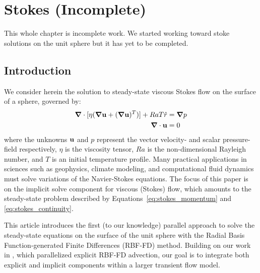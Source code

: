 
\chapter{Stokes (Incomplete)}

This whole chapter is incomplete work. We started working toward stoke solutions on the unit sphere but it has yet to be completed. 

\section{Introduction}

We consider herein the solution to steady-state viscous Stokes flow on the surface of a sphere, governed by: 
  \begin{align}
\mbox{\boldmath$ \nabla $} \cdot [\eta(\mbox{\boldmath$ \nabla $} \mathbf{u} + (\mbox{\boldmath$ \nabla $} \mathbf{u})^T)] + Ra T \hat{r} & = \mbox{\boldmath$ \nabla $} p \label{eq:stokes_momentum} \\
\mbox{\boldmath$ \nabla $} \cdot \mathbf{u} & = 0 \label{eq:stokes_continuity} 
\end{align}
where the unknowns $\mathbf{u}$ and $p$ represent the vector velocity- and scalar pressure-field respectively, $\eta$ is the viscosity tensor, $Ra$ is the non-dimensional Rayleigh number, and $T$ is an initial temperature profile. Many practical applications in sciences such as geophysics, climate modeling, and computational fluid dynamics must solve variations of the Navier-Stokes equations. The focus of this paper is on the implicit solve component for viscous (Stokes) flow, which amounts to the steady-state problem described by Equations~\ref{eq:stokes_momentum} and \ref{eq:stokes_continuity}. 



This article introduces the first (to our knowledge) parallel approach to solve the steady-state equations on the surface of the unit sphere with the Radial Basis Function-generated Finite Differences (RBF-FD) method. Building on our work in \cite{BolligFlyerErlebacher2012}, which parallelized explicit RBF-FD advection, our goal is to integrate both explicit and implicit components within a larger transient flow model. 



